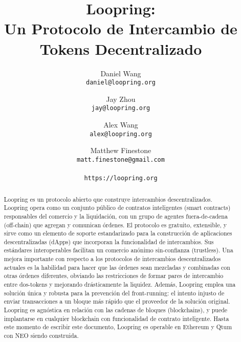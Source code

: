 \documentclass[UTF8,nofonts]{article}
\title{\textbf{Loopring:}\\\textbf{Un Protocolo de Intercambio de Tokens Decentralizado}}
\author{
  Daniel Wang\\
  \texttt{daniel@loopring.org}\\
  \and
  	Jay Zhou\\
  	\texttt{jay@loopring.org}\\
  	\and
  	Alex Wang\\
  	\texttt{alex@loopring.org}\\
  	\and
  	Matthew Finestone\\
  	\texttt{matt.finestone@gmail.com}\\ 
  \\
  \texttt{https://loopring.org}
 }
\begin{document}
\maketitle


\begin{abstract}
Loopring es un protocolo abierto que construye intercambios descentralizados. Loopring opera como un conjunto p\'ublico de contratos inteligentes (smart contracts) responsables del comercio y la liquidaci\'on, con un grupo de agentes fuera-de-cadena (off-chain) que agregan y comunican \'ordenes. El protocolo es gratuito, extensible, y sirve como un elemento de soporte estandarizado para la construcci\'on de aplicaciones descentralizadas (dApps) que incorporan la funcionalidad de intercambios. Sus est\'andares interoperables facilitan un comercio an\'onimo sin-confianza (trustless). Una mejora importante con respecto a los protocolos de intercambios descentralizados actuales es la habilidad para hacer que las \'ordenes sean mezcladas y combinadas con otras \'ordenes diferentes, obviando las restricciones de formar pares de intercambio entre dos-tokens y mejorando dr\'asticamente la liquidez. Adem\'as, Loopring emplea una soluci\'on \'unica y robusta para la prevenci\'on del front-running: el intento injusto de enviar transacciones a un bloque m\'as r\'apido que el proveedor de la soluci\'on original. Loopring es agn\'ostica en relaci\'on con las cadenas de bloques (blockchains), y puede implantarse en cualquier blockchain con funcionalidad de contrato inteligente. Hasta este momento de escribir este documento, Loopring es operable en Ethereum  \cite{buterin2017ethereum} \cite{wood2014ethereum} y Qtum \cite{dai2017smart} con NEO \cite{atterlonn2018distributed} siendo construida.
\end{abstract}
\end{document}
